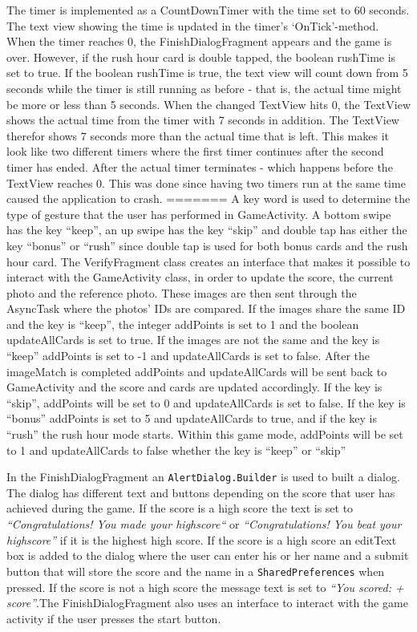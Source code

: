 The timer is implemented as a CountDownTimer with the time set to 60 seconds. The text view showing the time is updated in the timer’s ‘OnTick’-method.  When the timer reaches 0, the FinishDialogFragment appears and the game is over. However, if the rush hour card is double tapped, the boolean rushTime is set to true. If the boolean rushTime is true, the text view will count down from 5 seconds while the timer is still running as before - that is, the actual time might be more or less than 5 seconds. When the changed TextView hits 0, the TextView shows the actual time from the timer with 7 seconds in addition. The TextView therefor shows 7 seconds more than the actual time that is left. This makes it look like two different timers where the first timer continues after the second timer has ended. After the actual timer terminates - which happens before the TextView reaches 0. This was done since having two timers run at the same time caused the application to crash.
=======
A key word is used to determine the type of gesture that the user has performed in GameActivity. A bottom swipe has the key “keep”, an up swipe has the key “skip” and double tap has either the key “bonus” or “rush” since double tap is used for both bonus cards and the rush hour card.  The VerifyFragment class creates an interface that makes it possible to interact with the GameActivity class, in order to update the score, the current photo and the reference photo. These images are then sent through the AsyncTask where the photos’ IDs are compared.  If the images share the same ID and the key is “keep”, the integer addPoints is set to 1 and the boolean updateAllCards is set to true. If the images are not the same and the key is “keep” addPoints is set to -1 and updateAllCards is set to false. After the imageMatch is completed addPoints and updateAllCards will be sent back to GameActivity and the score and cards are updated accordingly. If the key is “skip”, addPoints will be set to 0 and updateAllCards is set to false. If the key is “bonus” addPoints is set to 5 and updateAllCards to true, and if the key is “rush” the rush hour mode starts. Within this game mode, addPoints will be set to 1 and updateAllCards to false whether the key is “keep” or “skip” \newline

In the FinishDialogFragment an \verb|AlertDialog.Builder| is used to built a dialog. The dialog has different text and buttons depending on the score that user has achieved during the game. If the score is a high score the text is set to \emph{“Congratulations! You made your highscore“} or \emph{“Congratulations! You beat your highscore”} if it is the highest high score. If the score is a high score an editText box is added to the dialog where the user can enter his or her name and a submit button that will store the score and the name in a \verb|SharedPreferences| when pressed. If the score is not a high score the message text is set to \emph{“You scored: + score”}.The FinishDialogFragment also uses an interface to interact with the game activity if the user presses the start button. \newline

